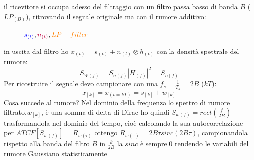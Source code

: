             il ricevitore si occupa adesso del filtraggio con un filtro passa basso di banda $B$ ($LP_{(B)}$), ritrovando il 
            segnale originale ma con il rumore additivo:
            \begin{figure}[H]
                \centering
                \caption{${\color{blue}s_{(t)}},{\color{purple}n_{(t)}},{\color{orange}LP-filter}$}
            \end{figure}
            in uscita dal filtro ho $x_{(t)} = s_{(t)} + n_{(t)} \otimes h_{(t)}$ con la densità spettrale del rumore:
            \[
                S_{W(f)} = S_{n(f)} |H_{(f)}|^2 = S_{n(f)} 
            \]
            Per ricostruire il segnale devo campionare con una $f_s = \frac{1}{T_s} = 2B$ ($kT$):
            \[
                x_{[k]} = x_{(t=kT)} = s_{[k]}+w_{[k]}    
            \]
            Cosa succede al rumore?
            Nel dominio della frequenza lo spettro di rumore filtrato,$w_{[k]}$, è  una somma di delta di Dirac ho quindi $S_{w(f)} = rect\left(\frac{f}{2B}\right)$
            trasformandola nel dominio del tempo, cioè calcolando la sua autocorrelazione per $ATCF[S_{w(f)}] = R_{w(\tau)}$ ottengo $R_{w(\tau)} = 2B\tau sinc(2B\tau)$,
            campionandola rispetto alla banda del filtro $B$ in $\frac{k}{2B}$ la $sinc$ è sempre $0$ rendendo le variabili del rumore Gaussiano statisticamente 
